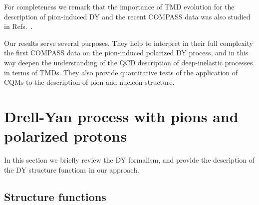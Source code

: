 \documentclass[a4paper]{article}
\begin{document}
For completeness we remark that the importance of TMD evolution
for the description of pion-induced DY and the recent COMPASS
data was also studied in
Refs.~\cite{Wang:2017zym,Vladimirov:2019bfa,Li:2019uhj,Ceccopieri:2018nop,
Wang:2018naw,Wang:2018pmx}. 


Our results serve several purposes. They help to interpret in their 
full complexity the first COMPASS data \cite{Aghasyan:2017jop} on the
pion-induced polarized DY process, and in this way deepen the understanding 
of the QCD description of deep-inelastic processes in terms of TMDs. 
They also provide quantitative tests of the application of  CQMs 
to the description of pion and nucleon structure.


\section{Drell-Yan process with pions and polarized protons}
 \label{sec-2}

In this section we briefly review the DY formalism, and 
provide the description of the DY structure functions in our approach.

\subsection{Structure functions}
\label{sec-2.1}
\end{document}
